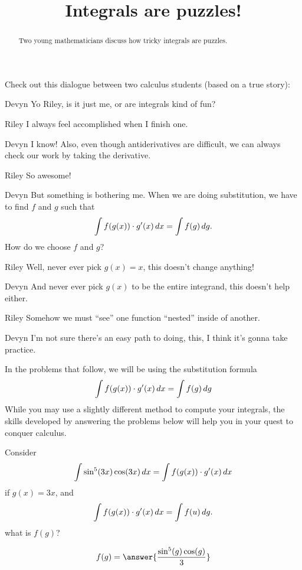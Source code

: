 \documentclass{ximera}
\title[Break-Ground:]{Integrals are puzzles!}
\begin{document}
\begin{abstract}
Two young mathematicians discuss how tricky integrals are puzzles.
\end{abstract}
\maketitle

Check out this dialogue between two calculus students (based on a true
story):

\begin{dialogue}
\item[Devyn] Yo Riley, is it just me, or are integrals kind of fun?
\item[Riley] I always feel accomplished when I finish one.
\item[Devyn] I know! Also, even though antiderivatives are difficult,
  we can always check our work by taking the derivative.
\item[Riley] So awesome!
\item[Devyn] But something is bothering me. When we are doing substitution,
  we have to find $f$ and $g$ such that
  \[
  \int f(g(x)) \cdot g'(x) \,d x = \int f(g) \,d g.
  \]
  How do we choose $f$ and $g$?
\item[Riley] Well, never ever pick $g(x) = x$, this doesn't change
    anything!
\item[Devyn] And never ever pick $g(x)$ to be the entire integrand,
  this doesn't help either.
\item[Riley] Somehow we must ``see'' one function ``nested'' inside of
  another.
\item[Devyn] I'm not sure there's an easy path to doing, this, I think
  it's gonna take practice.
\end{dialogue}


In the problems that follow, we will be using the substitution formula
\[
   \int f(g(x)) \cdot g'(x) \,d x = \int f(g) \,d
   g
\]
While you may use a slightly different method to compute your
integrals, the skills developed by answering the problems below will
help you in your quest to conquer calculus.

\begin{problem}
  Consider
  \[
  \int \sin^5(3x) \cos(3x) \,d x = \int f(g(x)) \cdot g'(x) \,d x
  \]
  if $g(x) = 3x$, and 
  \[
  \int f(g(x)) \cdot g'(x) \,d x = \int f(u) \,d g.
  \]
  what is $f(g)$?
  \begin{prompt}
    \[
    f(g) = \answer{
      \frac{\sin^5(g) \cos(g)}{3}}
    \]
  \end{prompt}
\end{problem}
\end{document}
